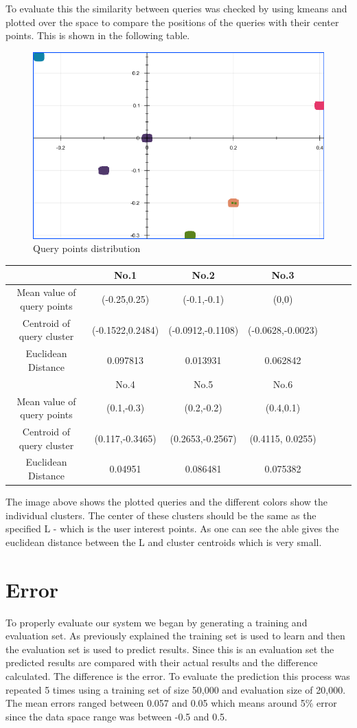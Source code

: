 \documentclass{lmproj}
\begin{document}
To evaluate this the similarity between queries was checked by using kmeans and plotted over the space to compare the positions of the queries with their center points. This is shown in the following table.

\begin{figure}[h!]
\centering
\includegraphics[width=.5\textwidth]{inputOfQuery.png}
\caption{Query points distribution}
\label{qpd}
\end{figure}

\begin{tabular}{|c|c|c|c|c|c|c|}
	\hline   & No.1 & No.2 & No.3  \\ 
	\hline Mean value of query points & (-0.25,0.25) & (-0.1,-0.1) & (0,0)  \\ 
	\hline Centroid of query cluster & (-0.1522,0.2484) & (-0.0912,-0.1108) & (-0.0628,-0.0023) \\ 
	\hline Euclidean Distance & 0.097813 & 0.013931 & 0.062842 \\
	\hline   & No.4 & No.5 & No.6 \\ 
	\hline Mean value of query points &  (0.1,-0.3) & (0.2,-0.2) & (0.4,0.1) \\ 
	\hline Centroid of query cluster & (0.117,-0.3465) & (0.2653,-0.2567) & (0.4115, 0.0255) \\ 
	\hline Euclidean Distance & 0.04951 & 0.086481 & 0.075382 \\	
	\hline
\end{tabular}

The image above shows the plotted queries and the different colors show the individual clusters. The center of these clusters should be the same as the specified L - which is the user interest points. As one can see the able gives the euclidean distance between the L and cluster centroids which is very small.

\section{Error}
To properly evaluate our system we began by generating a training and evaluation set. As previously explained the training set is used to learn and then the evaluation set is used to predict results. Since this is an evaluation set the predicted results are compared with their actual results and the difference calculated. The difference is the error. To evaluate the prediction this process was repeated 5 times using a training set of size 50,000 and evaluation size of 20,000. The mean errors ranged between 0.057 and 0.05 which means around 5\% error since the data space range was between -0.5 and 0.5.
\end{document}
